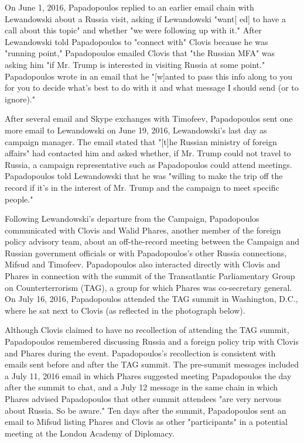 On June 1, 2016, Papadopoulos replied to an earlier email chain with Lewandowski about a Russia visit, asking if Lewandowski "want[ ed] to have a call about this topic" and whether "we were following up with it."%
After Lewandowski told Papadopoulos to "connect with" Clovis because he was "running point," Papadopoulos emailed Clovis that "the Russian MFA" was asking him "if Mr. Trump is interested in visiting Russia at some point."%
Papadopoulos wrote in an email that he "[w]anted to pass this info along to you for you to decide what's best to do with it and what message I should send (or to ignore)."%

After several email and Skype exchanges with Timofeev,%
Papadopoulos sent one more email to Lewandowski on June 19, 2016, Lewandowski's last day as campaign manager.%
The email stated that "[t]he Russian ministry of foreign affairs" had contacted him and asked whether, if Mr. Trump could not travel to Russia, a campaign representative such as Papadopoulos could attend meetings.%
Papadopoulos told Lewandowski that he was "willing to make the trip off the record if it's in the interest of Mr. Trump and the campaign to meet specific people."%

Following Lewandowski's departure from the Campaign, Papadopoulos communicated with Clovis and Walid Phares, another member of the foreign policy advisory team, about an off-the-record meeting between the Campaign and Russian government officials or with Papadopoulos's other Russia connections, Mifsud and Timofeev.%
Papadopoulos also interacted directly with Clovis and Phares in connection with the summit of the Transatlantic Parliamentary Group on Counterterrorism (TAG), a group for which Phares was co-secretary general.%
On July 16, 2016, Papadopoulos attended the TAG summit in Washington, D.C., where he sat next to Clovis (as reflected in the photograph below).%


Although Clovis claimed to have no recollection of attending the TAG summit,%
Papadopoulos remembered discussing Russia and a foreign policy trip with Clovis and Phares during the event.%
Papadopoulos's recollection is consistent with emails sent before and after the TAG summit.
The pre-summit messages included a July 11, 2016 email in which Phares suggested meeting Papadopoulos the day after the summit to chat,%
and a July 12 message in the same chain in which Phares advised Papadopoulos that other summit attendees "are very nervous about Russia. So be aware."%
Ten days after the summit, Papadopoulos sent an email to Mifsud listing Phares and Clovis as other "participants" in a potential meeting at the London Academy of Diplomacy.%

